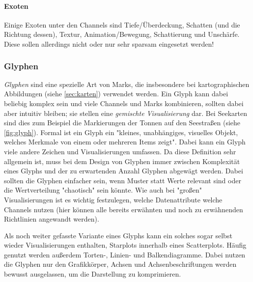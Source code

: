 				\paragraph{Exoten}
					Einige Exoten unter den Channels sind \bspw Tiefe/Überdeckung, Schatten (und die Richtung dessen), Textur, Animation/Bewegung, Schattierung und Unschärfe. Diese sollen allerdings nicht oder nur sehr sparsam eingesetzt werden!

			\subsubsection{Glyphen}
				\emph{Glyphen} sind eine spezielle Art von Marks, die insbesondere bei kartographischen Abbildungen (siehe \autoref{sec:karten}) verwendet werden. Ein Glyph kann dabei beliebig komplex sein und viele Channels und Marks kombinieren, sollten dabei aber intuitiv bleiben; sie stellen eine \emph{gemischte Visualisierung} dar. Bei Seekarten sind dies zum Beispiel die Markierungen der Tonnen auf den Seestraßen (siehe \autoref{fig:glyph}). Formal ist ein Glyph ein "kleines, unabhängiges, visuelles Objekt, welches Merkmale von einem oder mehreren Items zeigt". Dabei kann ein Glyph viele andere Zeichen und Visualisierungen umfassen. Da diese Definition sehr allgemein ist, muss bei dem Design von Glyphen immer zwischen Komplexität eines Glyphs und der zu erwartenden Anzahl Glyphen abgewägt werden. Dabei sollten die Glyphen einfacher sein, wenn Muster statt Werte relevant sind oder die Wertverteilung "chaotisch" sein könnte. Wie auch bei "großen" Visualisierungen ist es wichtig festzulegen, welche Datenattribute welche Channels nutzen (hier können alle bereits erwähnten und noch zu erwähnenden Richtlinien angewandt werden).

				Als noch weiter gefasste Variante eines Glyphs kann ein solches sogar selbst wieder Visualisierungen enthalten, \bspw Starplots innerhalb eines Scatterplots. Häufig genutzt werden außerdem Torten-, Linien- und Balkendiagramme. Dabei nutzen die Glyphen nur den Grafikkörper, Achsen und Achsenbeschriftungen werden bewusst ausgelassen, um die Darstellung zu komprimieren.

